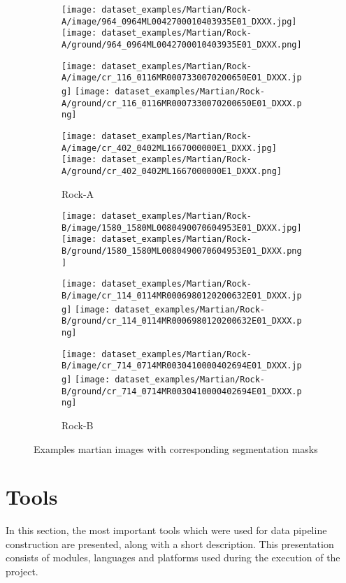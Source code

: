 \documentclass[a4paper,twoside,12pt]{book}
\begin{document}
\begin{figure}[!h]
    \centering
    \begin{subfigure}[b]{0.4\textwidth}
        \centering
        \caption{Rock-A}
        \texttt{[image: dataset\_examples/Martian/Rock-A/image/964\_0964ML0042700010403935E01\_DXXX.jpg]}
        \texttt{[image: dataset\_examples/Martian/Rock-A/ground/964\_0964ML0042700010403935E01\_DXXX.png]}

        \texttt{[image: dataset\_examples/Martian/Rock-A/image/cr\_116\_0116MR0007330070200650E01\_DXXX.jpg]}
        \texttt{[image: dataset\_examples/Martian/Rock-A/ground/cr\_116\_0116MR0007330070200650E01\_DXXX.png]}

        \texttt{[image: dataset\_examples/Martian/Rock-A/image/cr\_402\_0402ML1667000000E1\_DXXX.jpg]}
        \texttt{[image: dataset\_examples/Martian/Rock-A/ground/cr\_402\_0402ML1667000000E1\_DXXX.png]}


        \label{fig:rocka_martian_example}
    \end{subfigure}
    \begin{subfigure}[b]{0.4\textwidth}
        \centering
        \caption{Rock-B}
        \texttt{[image: dataset\_examples/Martian/Rock-B/image/1580\_1580ML0080490070604953E01\_DXXX.jpg]}
        \texttt{[image: dataset\_examples/Martian/Rock-B/ground/1580\_1580ML0080490070604953E01\_DXXX.png]}


        \texttt{[image: dataset\_examples/Martian/Rock-B/image/cr\_114\_0114MR0006980120200632E01\_DXXX.jpg]}
        \texttt{[image: dataset\_examples/Martian/Rock-B/ground/cr\_114\_0114MR0006980120200632E01\_DXXX.png]}

        \texttt{[image: dataset\_examples/Martian/Rock-B/image/cr\_714\_0714MR0030410000402694E01\_DXXX.jpg]}
        \texttt{[image: dataset\_examples/Martian/Rock-B/ground/cr\_714\_0714MR0030410000402694E01\_DXXX.png]}


        \label{fig:rockb_martian_example}
    \end{subfigure}
\caption{Examples martian images with corresponding segmentation masks}
\label{fig:martian_dataset_examples}
\end{figure}

\section{Tools}
In this section, the most important tools which were used for data pipeline construction are presented, along with a short description. This presentation consists of modules, languages and platforms used during the execution of the project.
\end{document}
